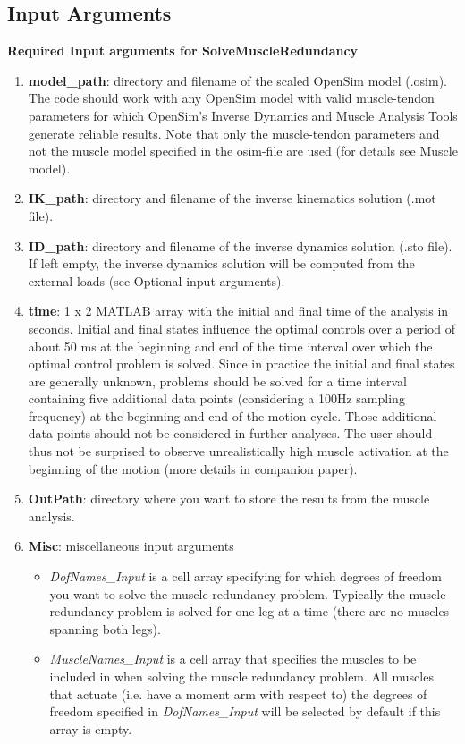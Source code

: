 \documentclass[a4paper,oneside,11pt]{article}
\begin{document}
\subsection{Input Arguments}


\textbf{Required Input arguments for SolveMuscleRedundancy
}\begin{enumerate}
	\item \textbf{model_path}: directory and filename of the scaled OpenSim model (.osim). The code should work with any OpenSim model with valid muscle-tendon parameters for which OpenSim's Inverse Dynamics and Muscle Analysis Tools generate reliable results. Note that only the muscle-tendon parameters and not the muscle model specified in the osim-file are used (for details see Muscle model).
	\item \textbf{IK_path}: directory and filename of the inverse kinematics solution (.mot file).
	\item \textbf{ID_path}: directory and filename of the inverse dynamics solution  (.sto file). If left empty, the inverse dynamics solution will be computed from the external loads (see Optional input arguments).
	\item \textbf{time}: 1 x 2 MATLAB array with the initial and final time of the analysis in seconds. Initial and final states influence the optimal controls over a period of about 50 ms at the beginning and end of the time interval over which the optimal control problem is solved. Since in practice the initial and final states are generally unknown, problems should be solved for a time interval containing five additional data points (considering a 100Hz sampling frequency) at the beginning and end of the motion cycle. Those additional data points should not be considered in further analyses. The user should thus not be surprised to observe unrealistically high muscle activation at the beginning of the motion (more details in companion paper).
	
	\item \textbf{OutPath}: directory where you want to store the results from the muscle analysis.
	\item \textbf{Misc}: miscellaneous input arguments
	\begin{itemize}
		\item \textit{DofNames_Input}  is a cell array specifying for which degrees of freedom you want to solve the muscle redundancy problem. Typically the muscle redundancy problem is solved for one leg at a time (there are no muscles spanning both legs).
		\item \textit{MuscleNames_Input} is a cell array that specifies the muscles to be included in when solving the muscle redundancy problem. All muscles that actuate (i.e. have a moment arm with respect to) the degrees of freedom specified in \textit{DofNames_Input} will be selected by default if this array is empty.
	\end{itemize}
\end{enumerate}
\end{document}
